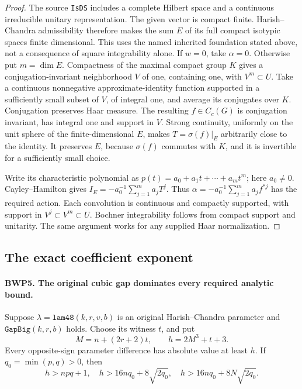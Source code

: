\begin{proof}
The source \texttt{IsDS} includes a complete Hilbert space and a
continuous irreducible unitary representation.  The given vector is
compact finite.  Harish--Chandra admissibility therefore makes the sum
\(E\) of its full compact isotypic spaces finite dimensional.  This
uses the named inherited foundation stated above, not a consequence
of square integrability alone.  If \(w=0\), take \(\alpha=0\).
Otherwise put \(m=\dim E\).  Compactness of the maximal compact
group \(K\) gives a conjugation-invariant neighborhood \(V\) of
one, containing one, with \(V^m\subset U\).
Take a continuous nonnegative approximate-identity function supported
in a sufficiently small subset of \(V\), of integral one, and
average its conjugates over \(K\).  Conjugation preserves Haar
measure.  The resulting \(f\in C_c(G)\) is conjugation invariant,
has integral one and support in \(V\).  Strong continuity, uniformly
on the unit sphere of the finite-dimensional \(E\), makes
\(T=\sigma(f)|_E\) arbitrarily close to the identity.  It preserves
\(E\), because \(\sigma(f)\) commutes with \(K\), and it is
invertible for a sufficiently small choice.

Write its characteristic polynomial as
\(p(t)=a_0+a_1t+\cdots+a_mt^m\); here \(a_0\ne0\).
Cayley--Hamilton gives
\(I_E=-a_0^{-1}\sum_{j=1}^m a_jT^j\).
Thus \(\alpha=-a_0^{-1}\sum_{j=1}^m a_j f^{*j}\) has
the required action.  Each convolution is continuous and compactly
supported, with support in \(V^j\subset V^m\subset U\).
Bochner integrability follows from compact support and unitarity.
The same argument works for any supplied Haar normalization.
\end{proof}

\subsection{The exact coefficient exponent}

\paragraph{BWP5. The original cubic gap dominates every required analytic bound.}
\label{claim:BWP5}
Suppose \(\lambda=\texttt{lam48}(k,r,v,b)\) is an original
Harish--Chandra parameter and \(\texttt{GapBig}(k,r,b)\) holds.
Choose its witness \(t\), and put
\[
 M=n+(2r+2)t,\qquad h=2M^3+t+3.
 \tag{BWP.9}
\]
Every opposite-sign parameter difference has absolute value at least
\(h\).  If \(q_0=\min(p,q)>0\), then
\[
 h>npq+1,\quad h>16nq_0+8\sqrt{2q_0},\quad
 h>16nq_0+8N\sqrt{2q_0}.
 \tag{BWP.10}
\]

